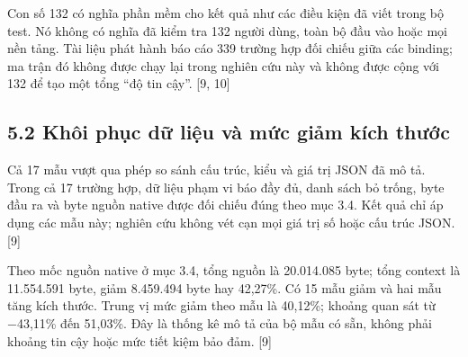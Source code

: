 \documentclass[11pt,a4paper]{article}
\begin{document}
Con số 132 có nghĩa phần mềm cho kết quả như các điều kiện đã viết trong bộ test. Nó không có nghĩa đã kiểm tra 132 người dùng, toàn bộ đầu vào hoặc mọi nền tảng. Tài liệu phát hành báo cáo 339 trường hợp đối chiếu giữa các binding; ma trận đó không được chạy lại trong nghiên cứu này và không được cộng với 132 để tạo một tổng “độ tin cậy”. [9, 10]


\subsection*{5.2 Khôi phục dữ liệu và mức giảm kích thước}
Cả 17 mẫu vượt qua phép so sánh cấu trúc, kiểu và giá trị JSON đã mô tả. Trong cả 17 trường hợp, dữ liệu phạm vi báo đầy đủ, danh sách bỏ trống, byte đầu ra và byte nguồn native được đối chiếu đúng theo mục 3.4. Kết quả chỉ áp dụng các mẫu này; nghiên cứu không vét cạn mọi giá trị số hoặc cấu trúc JSON. [9]


Theo mốc nguồn native ở mục 3.4, tổng nguồn là 20.014.085 byte; tổng context là 11.554.591 byte, giảm 8.459.494 byte hay 42,27\%. Có 15 mẫu giảm và hai mẫu tăng kích thước. Trung vị mức giảm theo mẫu là 40,12\%; khoảng quan sát từ −43,11\% đến 51,03\%. Đây là thống kê mô tả của bộ mẫu có sẵn, không phải khoảng tin cậy hoặc mức tiết kiệm bảo đảm. [9]
\end{document}
